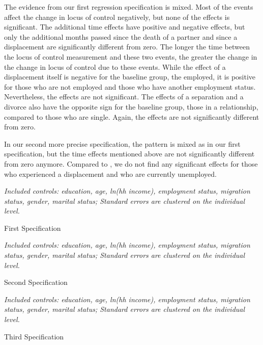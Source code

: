 \documentclass[12pt, a4paper, fleqn, parskip]{scrartcl}
\begin{document}
The evidence from our first regression specification is mixed. Most of the
events affect the change in locus of control negatively, but none of the
effects is significant. The additional time effects have positive and negative
effects, but only the additional months passed since the death of a partner and
since a displacement are significantly different from zero. The longer the time
between the locus of control measurement and these two events, the greater the
change in the change in locus of control due to these events. While the effect
of a displacement itself is negative for the baseline group, the employed, it
is positive for those who are not employed and those who have another
employment status. Nevertheless, the effects are not significant. The effects
of a separation and a divorce also have the opposite sign for the baseline
group, those in a relationship, compared to those who are single. Again, the
effects are not significantly different from zero.

In our second more precise specification, the pattern is mixed as in our first
specification, but the time effects mentioned above are not significantly
different from zero anymore. Compared to \citet{preuss2017}, we do not find any
significant effects for those who experienced a displacement and who are
currently unemployed.

\begin{table}[H]
    \tiny{}
    \footnotesize \textit{Included controls: education, age, ln(hh income),
    employment status, migration status, gender, marital status; Standard
    errors are clustered on the individual level.}
    \caption{First Specification}
    \label{tab:first_reg}
\end{table}


\begin{table}[H]
    \tiny{}
    \footnotesize \textit{Included controls: education, age, ln(hh income),
    employment status, migration status, gender, marital status; Standard
    errors are clustered on the individual level.}
    \caption{Second Specification}
    \label{tab:second_reg}
\end{table}

\begin{table}[H]
    
    \footnotesize \textit{Included controls: education, age, ln(hh income),
    employment status, migration status, gender, marital status; Standard
    errors are clustered on the individual level.}
    \caption{Third Specification}
    \label{tab:third_reg}
\end{table}
\end{document}

